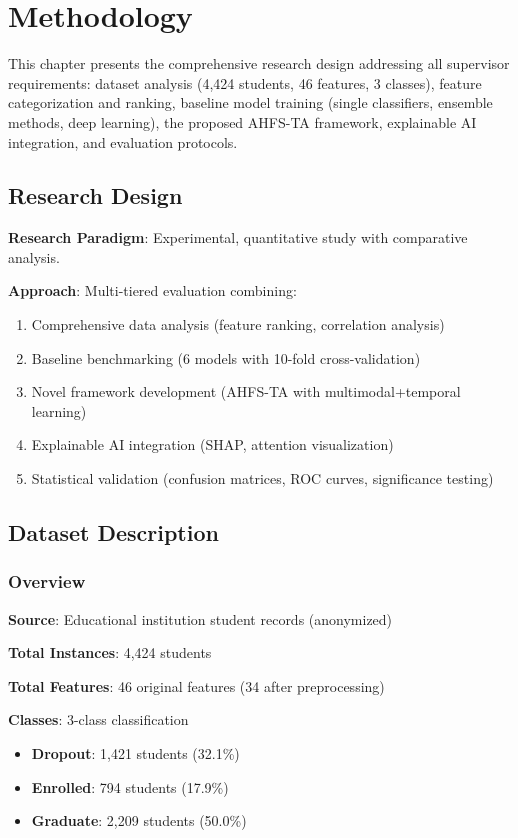 \chapter{Methodology}

This chapter presents the comprehensive research design addressing all supervisor requirements: dataset analysis (4,424 students, 46 features, 3 classes), feature categorization and ranking, baseline model training (single classifiers, ensemble methods, deep learning), the proposed AHFS-TA framework, explainable AI integration, and evaluation protocols.

\section{Research Design}

\textbf{Research Paradigm}: Experimental, quantitative study with comparative analysis.

\textbf{Approach}: Multi-tiered evaluation combining:
\begin{enumerate}
\item Comprehensive data analysis (feature ranking, correlation analysis)
\item Baseline benchmarking (6 models with 10-fold cross-validation)
\item Novel framework development (AHFS-TA with multimodal+temporal learning)
\item Explainable AI integration (SHAP, attention visualization)
\item Statistical validation (confusion matrices, ROC curves, significance testing)
\end{enumerate}

\section{Dataset Description}

\subsection{Overview}

\textbf{Source}: Educational institution student records (anonymized)

\textbf{Total Instances}: 4,424 students

\textbf{Total Features}: 46 original features (34 after preprocessing)

\textbf{Classes}: 3-class classification
\begin{itemize}
\item \textbf{Dropout}: 1,421 students (32.1\%)
\item \textbf{Enrolled}: 794 students (17.9\%)
\item \textbf{Graduate}: 2,209 students (50.0\%)
\end{itemize}

